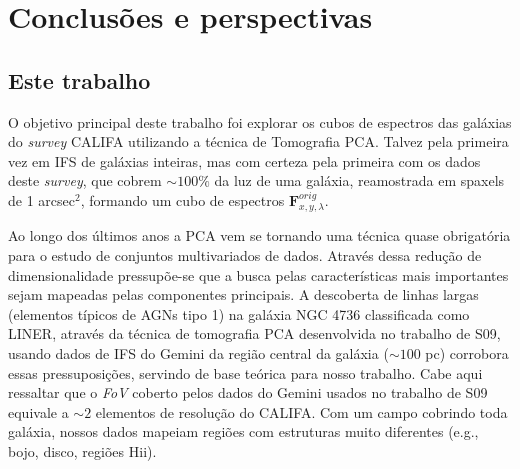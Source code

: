 


\chapter{Conclusões e perspectivas}
\label{sec:conclusao}


\section{Este trabalho}
\label{sec:conclusao:thisWork}

O objetivo principal deste trabalho foi explorar os cubos de espectros das galáxias do {\em survey} CALIFA utilizando a
técnica de Tomografia PCA. Talvez pela primeira vez em IFS de galáxias inteiras, mas com certeza pela primeira com os
dados deste {\em survey}, que cobrem $\sim100\%$ da luz de uma galáxia, reamostrada em spaxels de 1 arcsec$^2$, formando
um cubo de espectros $\mathbf{F}_{x,y,\lambda}^{orig}$. 

Ao longo dos últimos anos a PCA vem se tornando uma técnica quase obrigatória para o estudo de conjuntos multivariados
de dados. Através dessa redução de dimensionalidade pressupõe-se que a busca pelas características mais importantes sejam
mapeadas pelas componentes principais. A descoberta de linhas largas (elementos típicos de AGNs tipo 1) na galáxia NGC
4736 classificada como LINER, através da técnica de tomografia PCA desenvolvida no trabalho de S09, usando dados de IFS
do Gemini da região central da galáxia ($\sim100$ pc) corrobora essas pressuposições, servindo de base teórica para
nosso trabalho. Cabe aqui ressaltar que o {\em FoV} coberto pelos dados do Gemini usados no trabalho de S09 equivale a
$\sim2$ elementos de resolução do CALIFA. Com um campo cobrindo toda galáxia, nossos dados mapeiam regiões com
estruturas muito diferentes (e.g., bojo, disco, regiões H{\sc ii}).

